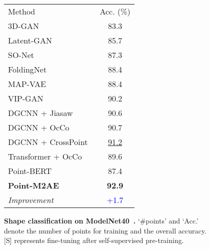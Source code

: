 \documentclass{article}
\makeatletter
\newcommand\tabcaption{\def\@captype{table}\caption}
\makeatother
\begin{document}
\begin{figure*}
\begin{minipage}[t!]{0.42\linewidth}
\centering
\small
\vspace{-0.35cm}
\tabcaption{\textbf{Linear evaluation on ModelNet40~\cite{modelnet40} by SVM.} We report different self-supervised learning methods and underline the second-best one.}
\vspace{0.4cm}
\label{svm}
\begin{adjustbox}{width=\linewidth}
	\begin{tabular}{lc}
	\toprule
Method &Acc. (\%)\\
        \cmidrule(lr){1-1} \cmidrule(lr){2-2}
        3D-GAN~\cite{3dgan}  &83.3  \\
        Latent-GAN~\cite{latentgan}   & 85.7  \\
SO-Net~\cite{sonet}   &87.3  \\
        FoldingNet~\cite{foldingnet}  &88.4 \\
        MAP-VAE~\cite{mapvae}  & 88.4 \\
VIP-GAN~\cite{vipgan}   &90.2 \\
		\cmidrule(lr){1-2}
		DGCNN + Jiasaw~\cite{jiasaw}  &90.6  \\
		DGCNN + OcCo~\cite{occo}  &90.7  \\
DGCNN + CrossPoint~\cite{afham2022crosspoint}  &\underline{91.2} \\
        \cmidrule(lr){1-2}
        Transformer + OcCo~\cite{pointbert} &89.6 \\
        Point-BERT~\cite{pointbert}  &87.4\vspace{0.05cm}\\
		\rowcolor{gray!8}\textbf{Point-M2AE}  &\textbf{ 92.9} \vspace{0.1cm}\\
		\textit{Improvement}  &\textcolor{blue}{+1.7} \\
	\bottomrule
	\end{tabular}
\vspace*{2pt}
\end{adjustbox}
\end{minipage}\quad
\begin{minipage}[t!]{0.56\linewidth}
\centering
\small
\vspace{-0.35cm}
\tabcaption{\textbf{Shape classification on ModelNet40~\cite{modelnet40}.} `\#points' and `Acc.' denote the number of points for training and the overall accuracy. {[S]} represents fine-tuning after self-supervised pre-training.}
\vspace{0.3cm}

\end{minipage}
\end{figure*}
\end{document}
